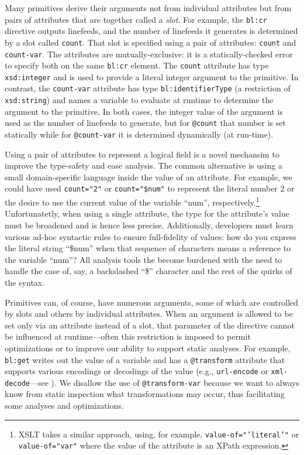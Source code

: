 \documentclass{www2003-submission}
\newcommand{\smtexttt}[1]{{\small\texttt{#1}}}
\begin{document}
Many primitives derive their arguments not from individual attributes
but from pairs of attributes that are together called a \emph{slot}.  For
example, the \smtexttt{bl:cr} directive outputs linefeeds, and the
number of linefeeds it generates is determined by a slot called
\smtexttt{count}.  That slot is specified using a pair of attributes:
\smtexttt{count} and \smtexttt{count-var}.  The attributes are
mutually-exclusive: it is a statically-checked error to specify both on
the same \smtexttt{bl:cr} element.  The \smtexttt{count} attribute has
type \smtexttt{xsd:integer} and is used to provide a literal integer
argument to the primitive.  In contrast, the \smtexttt{count-var}
attribute has type \smtexttt{bl:identifierType} (a restriction of
\smtexttt{xsd:string}) and names a variable to evaluate at runtime to
determine the argument to the primitive.  In both cases, the integer
value of the argument is used as the number of linefeeds to generate,
but for \smtexttt{@count} that number is set statically while for
\smtexttt{@count-var} it is determined dynamically (at run-time).

Using a pair of attributes to represent a logical field is a novel
mechansim to improve the type-safety and ease analysis.  The common
alternative is using a small domain-specific language inside the value
of an attribute.  For example, we could have used \smtexttt{count="2"}
or \smtexttt{count="\$num"} to represent the literal number 2 or the
desire to use the current value of the variable ``num'',
respectively.\footnote{XSLT takes a similar approach, using, for example,
\smtexttt{value-of="'literal'"} or \smtexttt{value-of="var"} where the
value of the attribute is an XPath expression.}
Unfortunatetly, when using a single attribute, the type for the
attribute's value must be broadened and is hence less precise.
Additionally, developers must learn various ad-hoc syntactic rules to
ensure full-fidelity of values:  how do you express the literal string
``\$num'' when that sequence of characters means a reference to the
variable ``num''?  All analysis tools the become burdened with the
need to handle the case of, say, a backslashed ``\$'' character and
the rest of the quirks of the syntax.

Primitives can, of course, have numerous arguments, some of which are
controlled by slots and others by individual attributes.  When an
argument is allowed to be set only via an attribute instead of a slot,
that parameter of the directive cannot be influenced at
runtime---often this restriction is imposed to permit optimizations or
to improve our ability to support static analyses.  For example,
\smtexttt{bl:get} writes out the value of a variable and has a
\smtexttt{@transform} attribute that supports various encodings or
decodings of the value (e.g., \smtexttt{url-encode} or
\smtexttt{xml-decode}---see ).  We disallow the
use of \smtexttt{@transform-var} because we want to always know from
static inspection what transformations may occur, thus facilitating
some analyses and optimizations.
\end{document}
